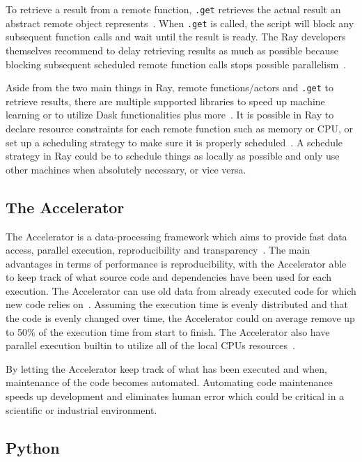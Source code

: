 \documentclass[12pt, a4paper]{article}
\begin{document}
To retrieve a result from a remote function, \texttt{.get} retrieves the actual result an abstract remote object represents~\cite{ray:FetchingResults}.
When \texttt{.get} is called, the script will block any subsequent function calls and wait until the result is ready.
The Ray developers themselves recommend to delay retrieving results as much as possible because blocking subsequent scheduled remote function calls stops possible parallelism~\cite{ray:delayget}.

Aside from the two main things in Ray, remote functions/actors and \texttt{.get} to retrieve results, there are multiple supported libraries to speed up machine learning or to utilize Dask functionalities plus more~\cite{ray:RaySGD, ray:Rayrllib, ray:RayTune, ray:RaySklearn, ray:DaskOnRay}. 
It is possible in Ray to declare resource constraints for each remote function such as memory or CPU, or set up a scheduling strategy to make sure it is properly scheduled~\cite{ray:Resources, ray:PlacementGroup}.
A schedule strategy in Ray could be to schedule things as locally as possible and only use other machines when absolutely necessary, or vice versa.

\subsection{The Accelerator}

The Accelerator is a data-processing framework which aims to provide fast data access, parallel execution, reproducibility and transparency~\cite{exax:Accelerator}.
The main advantages in terms of performance is reproducibility, with the Accelerator able to keep track of what source code and dependencies have been used for each execution.
The Accelerator can use old data from already executed code for which new code relies on~\cite{exax:sourceCode}.
Assuming the execution time is evenly distributed and that the code is evenly changed over time, the Accelerator could on average remove up to 50\% of the execution time from start to finish.
The Accelerator also have parallel execution builtin to utilize all of the local CPUs resources~\cite{exax:parallelExecution}.

By letting the Accelerator keep track of what has been executed and when, maintenance of the code becomes automated.
Automating code maintenance speeds up development and eliminates human error which could be critical in a scientific or industrial environment.

\subsection{Python}
\end{document}
